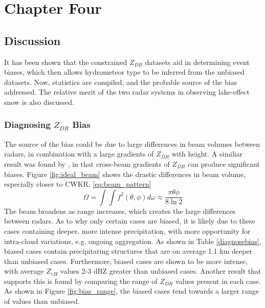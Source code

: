 \chapter{Chapter Four}
\section{Discussion}
It has been shown that the constrained $Z_{DR}$ datasets aid in determining event biases, which then allows hydrometeor type to be inferred from the unbiased
datasets. Now, statistics are compiled, and the probable source of the bias addressed. The relative merit of the two radar systems in observing lake-effect
snow is also discussed.
\subsection{Diagnosing $Z_{DR}$ Bias}
The source of the bias could be due to large differences in beam volumes between radars, in combination with a large gradients of $Z_{DR}$ with height. A similiar result was found by \citep{Ryzhkov2007a}, in that cross-beam gradients of $Z_{DR}$ can produce significant biases. Figure \ref{fig:ideal_beam} shows the drastic differences in beam volume, especially closer to CWKR. \ref{eq:beam_pattern}
\begin{equation}\label{eq:beam_pattern}
\Omega = \int \int f^{2}(\theta, \phi) d\omega \approx \frac{\pi \theta \phi}{8 \ln 2}
\end{equation}
 The beam broadens as range increases, which creates the large differences between radars. As to why only certain cases are biased, it is likely due to these cases containing deeper, more intense precipitation, with more opportunity for intra-cloud variations, e.g. ongoing aggregation. As shown in Table \ref{diagnosebias}, biased cases contain precipitating structures that are on average 1.1 km deeper than unbiased cases. Furthermore, biased cases are shown to be more intense, with average $Z_{eH}$ values 2-3 dBZ greater than unbiased cases. 
Another result that supports this is found by comparing the range of $Z_{DR}$ values present in each case. As shown in Figure \ref{fig:bias_range}, the biased cases tend towards a larger range of values than unbiased. 
